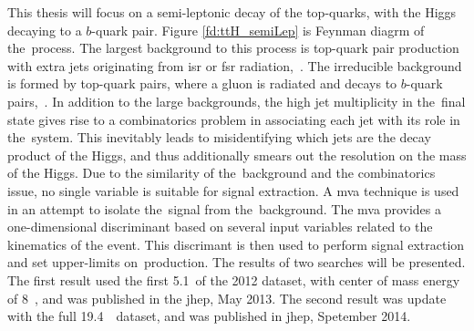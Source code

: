 \par This thesis will focus on a semi-leptonic decay of the top-quarks, with the Higgs decaying to a $b$-quark pair.  Figure \ref{fd:ttH_semiLep} is Feynman diagrm of the~\ttH process.  The largest background to this process is top-quark pair production with extra jets originating from \acrfull{isr} or \acrfull{fsr} radiation,~\ttjets.  The irreducible background is formed by top-quark pairs, where a gluon is radiated and decays to $b$-quark pairs,~\ttbb.  In addition to the large backgrounds, the high jet multiplicity in the~\ttH final state gives rise to a combinatorics problem in associating each jet with its role in the~\ttH system.  This inevitably leads to misidentifying which jets are the decay product of the Higgs, and thus additionally smears out the resolution on the mass of the Higgs.  Due to the similarity of the~\ttbb background and the combinatorics issue, no single variable is suitable for signal extraction.  A \acrfull{mva} technique is used in an attempt to isolate the~\ttH signal from the~\ttjets background.  The \acrshort{mva} provides a one-dimensional discriminant based on several input variables related to the kinematics of the event.  This discrimant is then used to perform signal extraction and set upper-limits on~\ttH production.  The results of two searches will be presented.  The first result used the first 5.1~\fbinv of the 2012 dataset, with center of mass energy of 8~\TeV, and was published in the \acrfull{jhep}, May 2013.  The second result was update with the full 19.4~~\TeV dataset, and was published in \acrshort{jhep}, Spetember 2014.   
